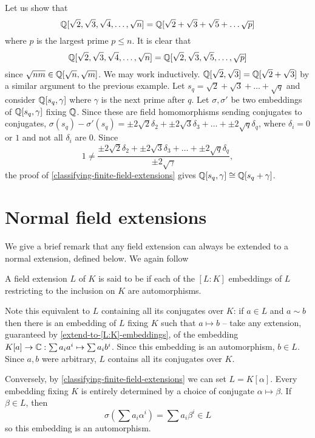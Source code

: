 \begin{example}
Let us show that $$\mathbb{Q}[\sqrt{2},\sqrt{3},\sqrt{4},\dots,\sqrt{n}]=\mathbb{Q}[\sqrt{2}+\sqrt{3}+\sqrt{5}+\dots\sqrt{p}]$$ where $p$ is the largest prime $p\leq n$. It is clear that $$\mathbb{Q}[\sqrt{2},\sqrt{3},\sqrt{4},\dots,\sqrt{n}]=\mathbb{Q}[\sqrt{2},\sqrt{3},\sqrt{5},\dots,\sqrt{p}]$$ since $\sqrt{nm}\in \mathbb{Q}[\sqrt{n},\sqrt{m}]$. We may work inductively. $\mathbb{Q}[\sqrt{2},\sqrt{3}]=\mathbb{Q}[\sqrt{2}+\sqrt{3}]$ by a similar argument to the previous example. Let $s_q=\sqrt{2}+\sqrt{3}+\dots+\sqrt{q}$ and consider $\mathbb{Q}[s_q,\gamma]$ where $\gamma$ is the next prime after $q$. Let $\sigma,\sigma'$ be two embeddings of $\mathbb{Q}[s_q,\gamma]$ fixing $\mathbb{Q}$. Since these are field homomorphisms sending conjugates to conjugates, $\sigma(s_q)-\sigma'(s_q)=\pm 2 \sqrt{2}\delta_2+\pm 2\sqrt{3}\delta_3+\dots+\pm 2\sqrt{q}\delta_q$, where $\delta_i=0$ or $1$ and not all $\delta_i$ are $0$. Since $$1\neq \frac{\pm 2\sqrt{2}\delta_2+\pm2 \sqrt{3}\delta_3+\dots+\pm 2\sqrt{q}\delta_q}{\pm 2\sqrt{\gamma}},$$
the proof of \cref{classifying-finite-field-extensions} gives $\mathbb{Q}[s_q,\gamma]\cong \mathbb{Q}[s_q+\gamma]$.
\end{example}

\section{Normal field extensions}
We give a brief remark that any field extension can always be extended to a normal extension, defined below. We again follow \cite{NumberFields}
\begin{definition}
A field extension $L$ of $K$ is said to be  if each of the $[L:K]$ embeddings of $L$ restricting to the inclusion on $K$ are automorphisms.
\end{definition}

Note this equivalent to $L$ containing all its conjugates over $K$: if $a\in L$ and $a\sim b$ then there is an embedding of $L$ fixing $K$ such that $a\mapsto b$ -- take any extension, guaranteed by \cref{extend-to-[L:K]-embeddings}, of the embedding $K[a]\rightarrow \mathbb{C} : \sum a_i a^i\mapsto \sum a_i b^i$. Since this embedding is an automorphism, $b\in L$. Since $a,b$ were arbitrary, $L$ contains all its conjugates over $K$. 

Conversely, by \cref{classifying-finite-field-extensions} we can set $L=K[\alpha]$. Every embedding fixing $K$ is entirely determined by a choice of conjugate $\alpha\mapsto \beta$. If $\beta \in L$, then $$\sigma(\sum a_i \alpha^i)=\sum a_i \beta^i\in L$$
so this embedding is an automorphism.


